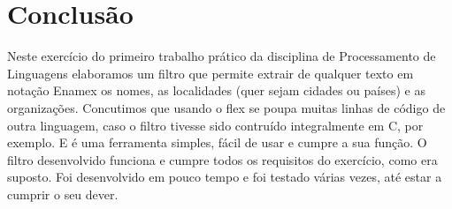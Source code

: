 \documentclass[11pt,a4paper]{article}
\begin{document}
\section{Conclusão}

Neste exercício do primeiro trabalho prático da disciplina de Processamento de Linguagens elaboramos um filtro que permite extrair de qualquer texto em notação Enamex os nomes, as localidades (quer sejam cidades ou países) e as organizações. Concutimos que usando o flex se poupa muitas linhas de código de outra linguagem, caso o filtro tivesse sido contruído integralmente em C, por exemplo. E é uma ferramenta simples, fácil de usar e cumpre a sua função. O filtro desenvolvido funciona e cumpre todos os requisitos do exercício, como era suposto. Foi desenvolvido em pouco tempo e foi testado várias vezes, até estar a cumprir o seu dever.
\end{document}
